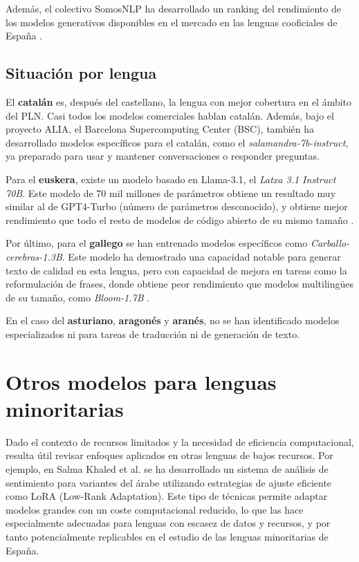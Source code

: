 Además, el colectivo SomosNLP ha desarrollado un ranking del rendimiento de los modelos generativos disponibles en el mercado en las lenguas cooficiales de España \cite{grandury2025leaderboard}.

\subsection{Situación por lengua}
\label{subsection:situacion-por-lengua}

El \textbf{catalán} es, después del castellano, la lengua con mejor cobertura en el ámbito del PLN. Casi todos los modelos comerciales hablan catalán. Además, bajo el proyecto ALIA, el Barcelona Supercomputing Center (BSC), también ha desarrollado modelos específicos para el catalán, como el \textit{salamandra-7b-instruct}, ya preparado para usar y mantener conversaciones o responder preguntas.

Para el \textbf{euskera}, existe un modelo basado en Llama-3.1, el \textit{Latxa 3.1 Instruct 70B}. Este modelo de 70 mil millones de parámetros obtiene un resultado muy similar al de GPT4-Turbo (número de parámetros desconocido), y obtiene mejor rendimiento que todo el resto de modelos de código abierto de su mismo tamaño \cite{etxaniz2024latxa}.

Por último, para el \textbf{gallego} se han entrenado modelos específicos como \textit{Carballo-cerebras-1.3B}. Este modelo ha demostrado una capacidad notable para generar texto de calidad en esta lengua, pero con capacidad de mejora en tareas como la reformulación de frases, donde obtiene peor rendimiento que modelos multilingües de su tamaño, como \textit{Bloom-1.7B} \cite{gamallo2024opengenerativelargelanguage}.

En el caso del \textbf{asturiano}, \textbf{aragonés} y \textbf{aranés}, no se han identificado modelos especializados ni para tareas de traducción ni de generación de texto.

\section{Otros modelos para lenguas minoritarias}

Dado el contexto de recursos limitados y la necesidad de eficiencia computacional, resulta útil revisar enfoques aplicados en otras lenguas de bajos recursos. Por ejemplo, en Salma Khaled et al. \cite{KHALED2025103682} se ha desarrollado un sistema de análisis de sentimiento para variantes del árabe utilizando estrategias de ajuste eficiente como LoRA (Low-Rank Adaptation). Este tipo de técnicas permite adaptar modelos grandes con un coste computacional reducido, lo que las hace especialmente adecuadas para lenguas con escasez de datos y recursos, y por tanto potencialmente replicables en el estudio de las lenguas minoritarias de España.

